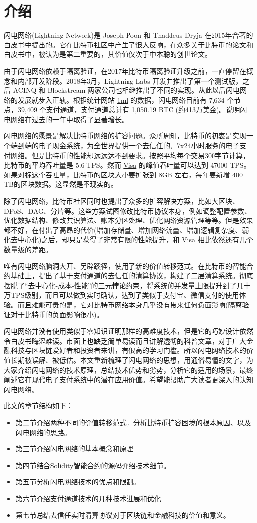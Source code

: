 \section{介绍}

闪电网络(Lightning Network)是 Joseph Poon 和 Thaddeus Dryja 在2015年合著的白皮书中提出的。它在比特币社区中产生了很大反响，在众多关于比特币的论文和白皮书中，被认为是第二重要的，其价值仅次于中本聪的创世论文。

由于闪电网络依赖于隔离验证，在2017年比特币隔离验证升级之前，一直停留在概念和内部开发阶段。2018年3月，Lightning Labs 开发并推出了第一个测试版，之后 ACINQ 和 Blockstream 两家公司也相继推出了不同的实现。从此以后闪电网络的发展就步入正轨。根据统计网站  \href{https://1ml.com/statistics}{1ml} 的数据，闪电网络目前有 7,634 个节点，39,409 个支付通道，支付通道总计有 1,050.19 BTC (约413万美金)。说明闪电网络在过去的一年中取得了显著增长。

闪电网络的愿景是解决比特币网络的扩容问题。众所周知，比特币的初衷是实现一个端到端的电子现金系统，为全世界提供一个去信任的、7x24小时服务的电子支付网络。但是比特币的性能却远远达不到要求。按照平均每个交易300字节计算，比特币的平均吞吐量是 5.6 TPS。然而 \href{https://www.visa.com/blogarchives/us/2013/10/10/stress-test-prepares-visanet-for-the-most-wonderful-time-of-the-year/index.html}{Visa} 的峰值吞吐量可以达到 47000 TPS。如果对标这个吞吐量，比特币的区块大小要扩张到 8GB 左右，每年要新增 400 TB的区块数据。这显然是不现实的。

除了闪电网络，比特币社区同时也提出了众多的扩容解决方案，比如大区块、DPoS、DAG、分片等。这些方案试图修改比特币协议本身，例如调整配置参数、优化数据结构、修改共识算法、账本分区处理、优化网络资源管理等等。但是效果都不好，在付出了高昂的代价(增加存储量、增加网络流量、增加逻辑复杂度、弱化去中心化)之后，却只是获得了非常有限的性能提升，和 Visa 相比依然还有几个数量级的差距。

唯有闪电网络脑洞大开、另辟蹊径，使用了新的价值转移范式。在比特币的智能合约基础上，提出了基于支付通道的去信任的清算协议，构建了二层清算系统。彻底摆脱了“去中心化-成本-性能”的三元悖论约束，将系统的并发量上限提升到了几十万TPS级别，而且可以做到实时确认，达到了类似于支付宝、微信支付的使用体验。而且难能可贵的是，它对比特币网络本身几乎没有带来任何负面影响(隔离验证对于比特币的负面影响很小)。

闪电网络并没有使用类似于零知识证明那样的高难度技术，但是它的巧妙设计依然令白皮书晦涩难读。市面上也缺乏简单易读而且讲解透彻的科普文章，对于广大金融科技与区块链爱好者和投资者来讲，有很高的学习门槛。所以闪电网络技术的价值长期被误解、被低估。本文重新梳理了闪电网络的思想，用通俗易懂的文字，为大家介绍闪电网络的技术原理，总结技术优势和劣势，分析它的适用的场景，最终阐述它在现代电子支付系统中的潜在应用价值。希望能帮助广大读者更深入的认知闪电网络。

此文的章节结构如下：

\begin{itemize}
    \item 第二节介绍两种不同的价值转移范式，分析比特币扩容困境的根本原因、以及闪电网络的思路。
    \item 第三节介绍闪电网络的基本概念和原理
    \item 第四节结合Solidity智能合约的源码介绍技术细节。
    \item 第五节分析闪电网络技术的优点和限制。
    \item 第六节介绍支付通道技术的几种技术进展和优化
    \item 第七节总结去信任实时清算协议对于区块链和金融科技的价值和意义。
\end{itemize}
